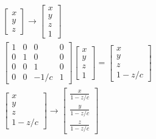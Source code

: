 \documentclass{article}
\begin{document}
\thispagestyle{empty}


\begin{eqnarray}
\begin{bmatrix}x \\ y \\ z\end{bmatrix} \rightarrow \begin{bmatrix}x \\ y \\ z \\ 1\end{bmatrix} \\
\begin{bmatrix}1&0&0&0 \\ 0&1&0&0\\ 0&0&1&0\\ 0 &0 &-1/c&1\end{bmatrix} \begin{bmatrix}x \\ y \\ z \\ 1\end{bmatrix} = \begin{bmatrix}x \\ y \\ z \\ 1-z/c\end{bmatrix}\\
\begin{bmatrix}x \\ y \\ z \\ 1-z/c\end{bmatrix}\rightarrow \begin{bmatrix}\frac{x}{1-z/c} \\ \frac{y}{1-z/c} \\ \frac{z}{1-z/c} \end{bmatrix}
\end{eqnarray}
\end{document}
